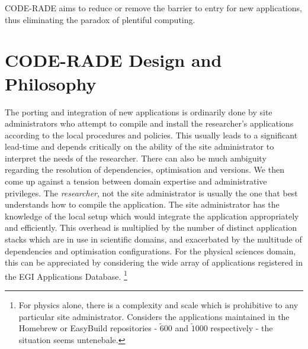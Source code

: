 \documentclass[a4paper]{jpconf}
\begin{document}
    CODE-RADE aims to reduce or remove the barrier to entry for new applications, thus eliminating
    the paradox of plentiful computing.

	\section{CODE-RADE Design and Philosophy}

    The porting and integration of new applications is ordinarily done by site administrators who
    attempt to compile and install the researcher's applications according to the local procedures and
    policies. This usually leads to a significant lead-time and depends critically on the
    ability of the site administrator to interpret the needs of the researcher. There
    can also be much ambiguity regarding the resolution of dependencies, optimisation and versions. We
    then come up against a tension between domain expertise and administrative privileges. The 
    {\it researcher}, not the site administrator is usually the one that best understands how to compile the
    application. The site administrator has the knowledge of the local setup
    which would integrate the application appropriately and efficiently. 
    This overhead is multiplied by the number of distinct application stacks which
    are in use in scientific domains, and exacerbated by the multitude of dependencies and
    optimisation configurations. For the physical sciences domain, this can be appreciated by
    considering the wide array of applications registered in the EGI Applications
    Database\cite{EGIAppDB}. \footnote{For physics alone,
    there is a complexity and scale which is prohibitive to any particular site administrator.
    Considers the applications maintained in the Homebrew or EasyBuild repositories -
    $\tilde 600$ and $\tilde 1000$ respectively - the situation seems untenebale.}

\end{document}
